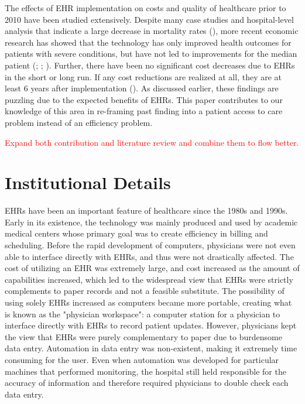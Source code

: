 \documentclass[11pt]{article}
\begin{document}
The effects of EHR implementation on costs and quality of healthcare prior to 2010 have been studied extensively. Despite many case studies and hospital-level analysis that indicate a large decrease in mortality rates (\cite{Buntin2011TheResults}), more recent economic research has showed that the technology has only improved health outcomes for patients with severe conditions, but have not led to improvements for the median patient (\cite{Agha2014TheCare}; \cite{McCullough2016HealthCoordination}; \cite{Meyerhoefer}). Further, there have been no significant cost decreases due to EHRs in the short or long run. If any cost reductions are realized at all, they are at least 6 years after implementation (\cite{dranove2014trillion}). As discussed earlier, these findings are puzzling due to the expected benefits of EHRs. This paper contributes to our knowledge of this area in re-framing past finding into a patient access to care problem instead of an efficiency problem.

\textcolor{red}{Expand both contribution and literature review and combine them to flow better.}


\newpage


\section{Institutional Details}

EHRs have been an important feature of healthcare since the 1980s and 1990s. Early in its existence, the technology was mainly produced and used by academic medical centers whose primary goal was to create efficiency in billing and scheduling. Before the rapid development of computers, physicians were not even able to interface directly with EHRs, and thus were not drastically affected. The cost of utilizing an EHR was extremely large, and cost increased as the amount of capabilities increased, which led to the widespread view that EHRs were strictly complements to paper records and not a feasible substitute. The possibility of using solely EHRs increased as computers became more portable, creating what is known as the "physician workspace": a computer station for a physician to interface directly with EHRs to record patient updates. However, physicians kept the view that EHRs were purely complementary to paper due to burdensome data entry. Automation in data entry was non-existent, making it extremely time consuming for the user. Even when automation was developed for particular machines that performed monitoring, the hospital still held responsible for the accuracy of information and therefore required physicians to double check each data entry. 
\end{document}

